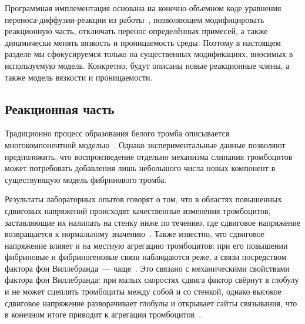 Программная имплементация основана на конечно-объемном коде
уравнения переноса-диффузии-реакции из работы~\cite{vassilevski2020parallel},
позволяющем модифицировать реакционную часть,
отключать перенос определённых примесей,
а также динамически менять вязкость и проницаемость среды.
Поэтому в настоящем разделе мы сфокусируемся только на существенных модификациях,
вносимых в используемую модель.
Конкретно, будут описаны новые реакционные члены, а также модель вязкости и проницаемости.

\subsection{Реакционная часть}
\label{subsection:white_clot_model:reactions}

Традиционно процесс образования белого тромба описывается
многокомпонентной моделью~\cite{sorensen1999platelets_deposition_model, goodman2005thrombosis_model, taylor2016thrombosis_model, wu2017deposition_model}.
Однако экспериментальные данные позволяют предположить,
что воспроизведение отдельно механизма слипания тромбоцитов может потребовать добавления
лишь небольшого числа новых компонент в существующую модель фибринового тромба.

Результаты лабораторных опытов говорят о том,
что в областях повышенных сдвиговых напряжений происходят качественные изменения тромбоцитов,
заставляющие их налипать на стенку ниже по течению,
где сдвиговое напряжение возвращается к нормальному значению~\cite{rahman2019platelet_adhesion}.
Также известно, что сдвиговое напряжение влияет и на местную агрегацию тромбоцитов:
при его повышении фибриновые и фибриногеновые связи наблюдаются реже,
а связи посредством фактора фон Виллебранда~--- чаще~\cite{savage1996platelet_adhesion}.
Это связано с механическими свойствами фактора фон Виллебранда:
при малых скоростях сдвига фактор свёрнут в глобулу
и не может сцеплять тромбоциты между собой и со стенкой,
однако высокое сдвиговое напряжение разворачивает глобулы и открывает сайты связывания,
что в конечном итоге приводит к агрегации тромбоцитов~\cite{lippok2016vWF_unfolding, schneider2007vWF_unfolding, zhussupbekov2021vWF_unfolding, avtaeva2022vWF}.

